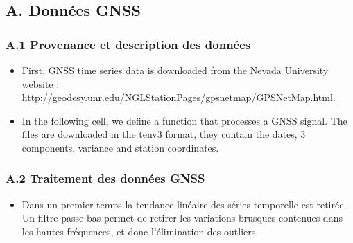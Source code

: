 \documentclass[11pt]{article}
\providecommand{\tightlist}{%
      \setlength{\itemsep}{0pt}\setlength{\parskip}{0pt}}
\begin{document}
\hypertarget{a.-donnuxe9es-gnss}{%
\subsection{A. Données GNSS}\label{a.-donnuxe9es-gnss}}

\hypertarget{a.1-provenance-et-description-des-donnuxe9es}{%
\subsubsection{A.1 Provenance et description des
données}\label{a.1-provenance-et-description-des-donnuxe9es}}

    \begin{itemize}
\tightlist
\item
  First, GNSS time series data is downloaded from the Nevada University
  website :
  http://geodesy.unr.edu/NGLStationPages/gpsnetmap/GPSNetMap.html.
\item
  In the following cell, we define a function that processes a GNSS
  signal. The files are downloaded in the tenv3 format, they contain the
  dates, 3 components, variance and station coordinates.
\end{itemize}

    \hypertarget{a.2-traitement-des-donnuxe9es-gnss}{%
\subsubsection{A.2 Traitement des données
GNSS}\label{a.2-traitement-des-donnuxe9es-gnss}}

    \begin{itemize}
\tightlist
\item
  Dans un premier temps la tendance linéaire des séries temporelle est
  retirée. Un filtre passe-bas permet de retirer les variations brusques
  contenues dans les hautes fréquences, et donc l'élimination des
  outliers.
\end{itemize}
\end{document}
